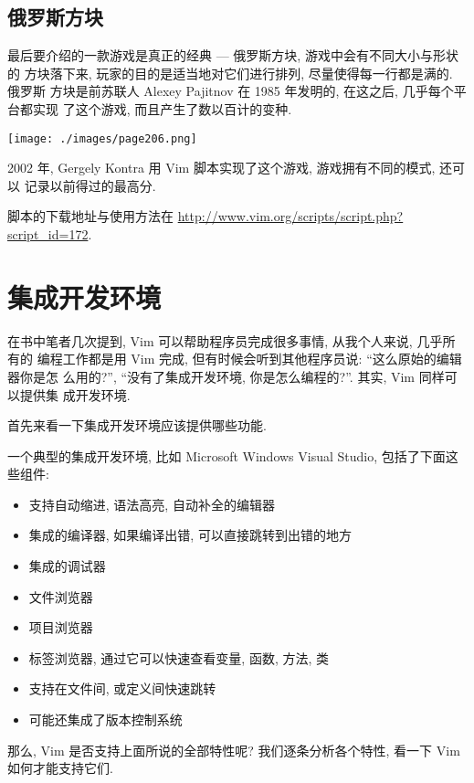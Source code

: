\subsection{俄罗斯方块}
\label{subsec:tetris}

最后要介绍的一款游戏是真正的经典 --- 俄罗斯方块, 游戏中会有不同大小与形状的
方块落下来, 玩家的目的是适当地对它们进行排列, 尽量使得每一行都是满的. 俄罗斯
方块是前苏联人 Alexey Pajitnov 在 1985 年发明的, 在这之后, 几乎每个平台都实现
了这个游戏, 而且产生了数以百计的变种.

\begin{center}
    \texttt{[image: ./images/page206.png]}
\end{center}

2002 年, Gergely Kontra 用 Vim 脚本实现了这个游戏, 游戏拥有不同的模式, 还可以
记录以前得过的最高分.

脚本的下载地址与使用方法在
\url{http://www.vim.org/scripts/script.php?script_id=172}.

\section{集成开发环境}
\label{sec:programmers_ide}

在书中笔者几次提到, Vim 可以帮助程序员完成很多事情, 从我个人来说, 几乎所有的
编程工作都是用 Vim 完成, 但有时候会听到其他程序员说: ``这么原始的编辑器你是怎
么用的?'', ``没有了集成开发环境, 你是怎么编程的?''. 其实, Vim 同样可以提供集
成开发环境.

首先来看一下集成开发环境应该提供哪些功能.

一个典型的集成开发环境, 比如 Microsoft Windows Visual Studio\textregistered,
包括了下面这些组件:
\begin{itemize}
    \item 支持自动缩进, 语法高亮, 自动补全的编辑器
    \item 集成的编译器, 如果编译出错, 可以直接跳转到出错的地方
    \item 集成的调试器
    \item 文件浏览器
    \item 项目浏览器
    \item 标签浏览器, 通过它可以快速查看变量, 函数, 方法, 类
    \item 支持在文件间, 或定义间快速跳转
    \item 可能还集成了版本控制系统
\end{itemize}
那么, Vim 是否支持上面所说的全部特性呢? 我们逐条分析各个特性, 看一下 Vim
如何才能支持它们.

